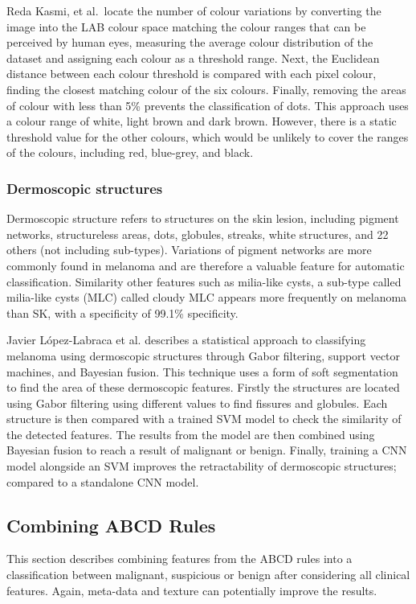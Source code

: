 Reda Kasmi, et al.\ locate the number of colour variations by converting the image into the LAB colour space matching the colour ranges that can be perceived by human eyes\cite{Myridis2014a}, measuring the average colour distribution of the dataset and assigning each colour as a threshold range. Next, the Euclidean distance between each colour threshold is compared with each pixel colour\cite{Kasmi2016}, finding the closest matching colour of the six colours. Finally, removing the areas of colour with less than 5\% prevents the classification of dots. This approach uses a colour range of white, light brown and dark brown. However, there is a static threshold value for the other colours, which would be unlikely to cover the ranges of the colours, including red, blue-grey, and black.

\subsubsection{Dermoscopic structures}
Dermoscopic structure refers to structures on the skin lesion, including pigment networks, structureless areas, dots, globules, streaks, white structures, and 22 others (not including sub-types). Variations of pigment networks are more commonly found in melanoma\cite{Anantha04} and are therefore a valuable feature for automatic classification. Similarity other features such as milia-like cysts, a sub-type called milia-like cysts (MLC) called cloudy MLC appears more frequently on melanoma than SK, with a specificity of  99.1\% specificity\cite{Stricklin2011}.

Javier López-Labraca et al.\cite{Lopez-Labraca2018} describes a statistical approach to classifying melanoma using dermoscopic structures through Gabor filtering, support vector machines, and Bayesian fusion. This technique uses a form of soft segmentation to find the area of these dermoscopic features. Firstly the structures are located using Gabor filtering using different values to find fissures and globules. Each structure is then compared with a trained SVM model to check the similarity of the detected features. The results from the model are then combined using Bayesian fusion to reach a result of malignant or benign. Finally, training a CNN model alongside an SVM improves the retractability of dermoscopic structures; compared to a standalone CNN model.

\subsection{Combining ABCD Rules}
This section describes combining features from the ABCD rules into a classification between malignant, suspicious or benign after considering all clinical features. Again, meta-data and texture can potentially improve the results.

